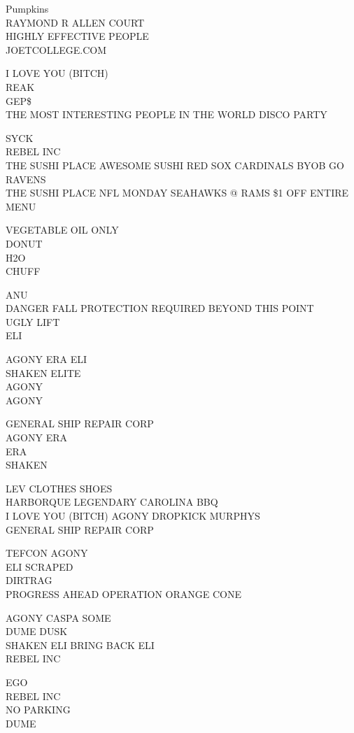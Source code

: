 \documentclass[10pt,letterpaper]{article}
\begin{document}
Pumpkins\\
RAYMOND R ALLEN COURT\\
HIGHLY EFFECTIVE PEOPLE\\
JOETCOLLEGE.COM

I LOVE YOU (BITCH)\\
REAK\\
GEP\$\\
THE MOST INTERESTING PEOPLE IN THE WORLD DISCO PARTY

SYCK\\
REBEL INC\\
THE SUSHI PLACE AWESOME SUSHI RED SOX CARDINALS BYOB GO RAVENS\\
THE SUSHI PLACE NFL MONDAY SEAHAWKS @ RAMS \$1 OFF ENTIRE MENU

VEGETABLE OIL ONLY\\
DONUT\\
H2O\\
CHUFF

ANU\\
DANGER FALL PROTECTION REQUIRED BEYOND THIS POINT\\
UGLY LIFT\\
ELI

AGONY ERA ELI\\
SHAKEN ELITE\\
AGONY\\
AGONY

GENERAL SHIP REPAIR CORP\\
AGONY ERA\\
ERA\\
SHAKEN

LEV CLOTHES SHOES\\
HARBORQUE LEGENDARY CAROLINA BBQ\\
I LOVE YOU (BITCH) AGONY DROPKICK MURPHYS\\
GENERAL SHIP REPAIR CORP

TEFCON AGONY\\
ELI SCRAPED\\
DIRTRAG\\
PROGRESS AHEAD OPERATION ORANGE CONE

AGONY CASPA SOME\\
DUME DUSK\\
SHAKEN ELI BRING BACK ELI\\
REBEL INC

EGO\\
REBEL INC\\
NO PARKING\\
DUME
\end{document}
